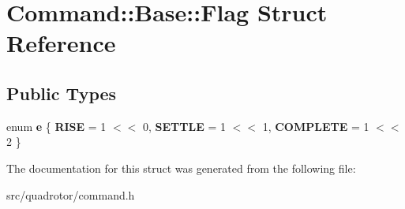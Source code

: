 \hypertarget{structCommand_1_1Base_1_1Flag}{
\section{Command::Base::Flag Struct Reference}
\label{structCommand_1_1Base_1_1Flag}
}
\subsection*{Public Types}
\begin{DoxyCompactItemize}
\item 
enum {\bfseries e} \{ {\bfseries RISE} =  1 $<$$<$ 0, 
{\bfseries SETTLE} =  1 $<$$<$ 1, 
{\bfseries COMPLETE} =  1 $<$$<$ 2
 \}
\end{DoxyCompactItemize}


The documentation for this struct was generated from the following file:\begin{DoxyCompactItemize}
\item 
src/quadrotor/command.h\end{DoxyCompactItemize}
